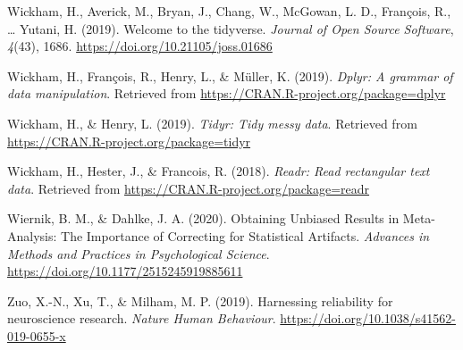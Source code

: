 \documentclass[english,man,floatsintext]{apa6}
\begin{document}
\leavevmode\hypertarget{ref-R-tidyverse}{}%
Wickham, H., Averick, M., Bryan, J., Chang, W., McGowan, L. D., François, R., \ldots{} Yutani, H. (2019). Welcome to the tidyverse. \emph{Journal of Open Source Software}, \emph{4}(43), 1686. \url{https://doi.org/10.21105/joss.01686}

\leavevmode\hypertarget{ref-R-dplyr}{}%
Wickham, H., François, R., Henry, L., \& Müller, K. (2019). \emph{Dplyr: A grammar of data manipulation}. Retrieved from \url{https://CRAN.R-project.org/package=dplyr}

\leavevmode\hypertarget{ref-R-tidyr}{}%
Wickham, H., \& Henry, L. (2019). \emph{Tidyr: Tidy messy data}. Retrieved from \url{https://CRAN.R-project.org/package=tidyr}

\leavevmode\hypertarget{ref-R-readr}{}%
Wickham, H., Hester, J., \& Francois, R. (2018). \emph{Readr: Read rectangular text data}. Retrieved from \url{https://CRAN.R-project.org/package=readr}

\leavevmode\hypertarget{ref-wiernik_obtaining_2020}{}%
Wiernik, B. M., \& Dahlke, J. A. (2020). Obtaining Unbiased Results in Meta-Analysis: The Importance of Correcting for Statistical Artifacts. \emph{Advances in Methods and Practices in Psychological Science}. \url{https://doi.org/10.1177/2515245919885611}

\leavevmode\hypertarget{ref-zuo_harnessing_2019}{}%
Zuo, X.-N., Xu, T., \& Milham, M. P. (2019). Harnessing reliability for neuroscience research. \emph{Nature Human Behaviour}. \url{https://doi.org/10.1038/s41562-019-0655-x}

\endgroup
\end{document}
